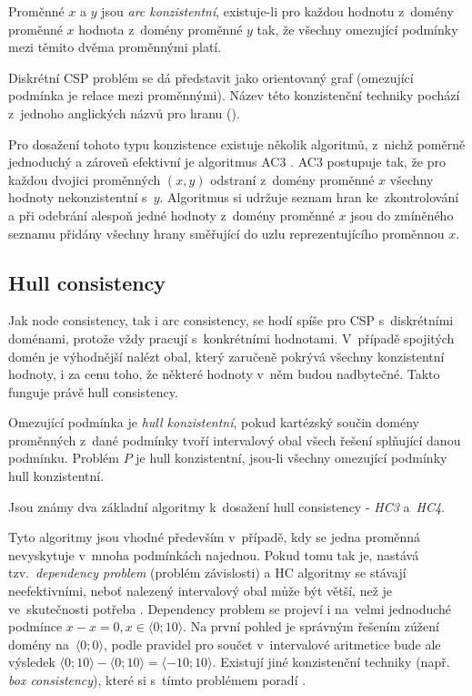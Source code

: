 \begin{definition}
\label{def:arcConsistency}
Proměnné $x$ a $y$ jsou \emph{arc konzistentní}, existuje-li pro každou hodnotu z~domény proměnné $x$ hodnota z~domény proměnné $y$ tak, že všechny omezující podmínky mezi těmito dvěma proměnnými platí.
\end{definition}

Diskrétní CSP problém se dá představit jako orientovaný graf (omezující podmínka je relace mezi proměnnými). Název této konzistenční techniky pochází z~jednoho anglických názvů pro hranu ().

Pro dosažení tohoto typu konzistence existuje několik algoritmů, z~nichž poměrně jednoduchý a zároveň efektivní je algoritmus AC3 \cite{bartakGuide}. AC3 postupuje tak, že pro každou dvojici proměnných $(x, y)$ odstraní z~domény proměnné $x$ všechny hodnoty nekonzistentní s~$y$. Algoritmus si udržuje seznam hran ke~zkontrolování a při odebrání alespoň jedné hodnoty z~domény proměnné $x$ jsou do zmíněného seznamu přidány všechny hrany směřující do uzlu reprezentujícího proměnnou $x$.






\subsection{Hull consistency}

Jak node consistency, tak i arc consistency, se hodí spíše pro CSP s~diskrétními doménami, protože vždy pracují s~konkrétními hodnotami. V~případě spojitých domén je výhodnější nalézt obal, který zaručeně pokrývá všechny konzistentní hodnoty, i za cenu toho, že některé hodnoty v~něm budou nadbytečné. Takto funguje právě hull consistency.

\begin{definition}
\label{def:hullConsistency}
Omezující podmínka je \emph{hull konzistentní}, pokud kartézský součin domény proměnných z~dané podmínky tvoří intervalový obal všech řešení splňující danou podmínku. Problém $P$ je hull konzistentní, jsou-li všechny omezující podmínky hull konzistentní.
\end{definition}

Jsou známy dva základní algoritmy k~dosažení hull consistency - \emph{HC3} a~\emph{HC4}.

Tyto algoritmy jsou vhodné především v~případě, kdy se jedna proměnná nevyskytuje v~mnoha podmínkách najednou. Pokud tomu tak je, nastává tzv.~\emph{dependency problem} (problém závislosti) a HC algoritmy se stávají neefektivními, neboť nalezený intervalový obal může být větší, než je ve~skutečnosti potřeba \cite{BenhamouCLPIntervals}. Dependency problem se projeví i na~velmi jednoduché podmínce $x - x = 0, x \in \langle 0;10 \rangle$. Na první pohled je správným řešením zúžení domény na~$\langle 0;0\rangle$, podle pravidel pro součet v~intervalové aritmetice bude ale výsledek $\langle 0;10 \rangle - \langle 0;10\rangle = \langle -10; 10 \rangle$. Existují jiné konzistenční techniky (např. \emph{box consistency}), které si s~tímto problémem poradí \cite{rueherDependency}.

